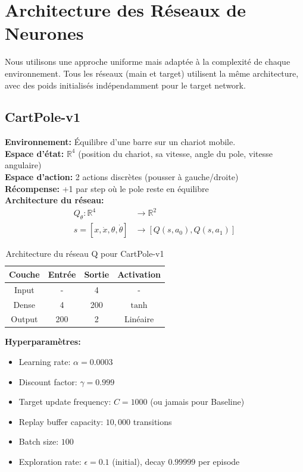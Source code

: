 \section{Architecture des Réseaux de Neurones}

Nous utilisons une approche uniforme mais adaptée à la complexité de chaque environnement.
Tous les réseaux (main et target) utilisent la même architecture, avec des poids initialisés indépendamment
pour le target network.

\subsection{CartPole-v1}

\textbf{Environnement:} Équilibre d'une barre sur un chariot mobile. \\
\textbf{Espace d'état:} $\mathbb{R}^4$ (position du chariot, sa vitesse, angle du pole, vitesse angulaire) \\
\textbf{Espace d'action:} 2 actions discrètes (pousser à gauche/droite) \\
\textbf{Récompense:} +1 par step où le pole reste en équilibre \\

\textbf{Architecture du réseau:}
\[
\begin{aligned}
Q_\theta : \mathbb{R}^4 &\to \mathbb{R}^2 \\
s = [x, \dot{x}, \theta, \dot{\theta}] &\to [Q(s, a_0), Q(s, a_1)]
\end{aligned}
\]

\vspace{0.3cm}
\begin{table}[h!]
    \centering
    \begin{tabular}{|c|c|c|c|}
    \hline
    \textbf{Couche} & \textbf{Entrée} & \textbf{Sortie} & \textbf{Activation} \\
    \hline
    Input & - & 4 & - \\
    \hline
    Dense & 4 & 200 & $\tanh$ \\
    \hline
    Output & 200 & 2 & Linéaire \\
    \hline
    \end{tabular}
    \caption{Architecture du réseau Q pour CartPole-v1}
\end{table}

\textbf{Hyperparamètres:}
\begin{itemize}
    \item Learning rate: $\alpha = 0.0003$
    \item Discount factor: $\gamma = 0.999$
    \item Target update frequency: $C = 1000$ (ou jamais pour Baseline)
    \item Replay buffer capacity: $10,000$ transitions
    \item Batch size: $100$
    \item Exploration rate: $\epsilon = 0.1$ (initial), decay $0.99999$ per episode
\end{itemize}

